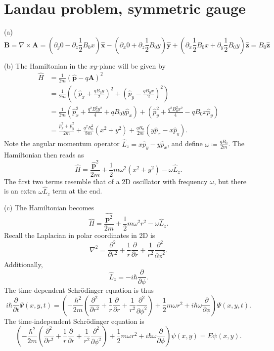 \documentclass[11pt, letterpaper]{article}
\begin{document}
\section{Landau problem, symmetric gauge}

(a) 
\[
	\mathbf{B} =\nabla \times \mathbf{A} =\left( \partial _y0 - \partial _z \frac{1}{2} B_0x \right) \mathbf{\hat{x} } -\left( \partial _x0+\partial _z\frac{1}{2} B_0y \right) \mathbf{\hat{y} } + \left( \partial _x\frac{1}{2} B_0x + \partial _y\frac{1}{2} B_0y \right) \mathbf{\hat{z} } =B_0\mathbf{\hat{z} } 
\]

(b) The Hamiltonian in the $xy$-plane will be given by
\begin{align*}
	\hat{H} &=\frac{1}{2m} \left( \hat{\mathbf{p} } -q \mathbf{A}  \right) ^2\\
		&=\frac{1}{2m} \left(\left( \hat{p} _x+\frac{qB_0y}{2} \right) ^2+  \left( \hat{p} _y - \frac{qB_0x}{2}  \right) ^2\right)\\
		&=\frac{1}{2m} \left( \hat{p}_x^2 +\frac{q^2B_0^2y^2}{4} +qB_0y \hat{p}_x\right) +\left( \hat{p} _y^2 + \frac{q^2B_0^2x^2}{4} -qB_0x \hat{p}_y \right) \\
		&=\frac{\hat{p} _x^2 + \hat{p} _y^2}{2m} +\frac{q^2B_0^2}{8m} \left( x^2+y^2 \right) +\frac{qB_0}{2m} \left( y \hat{p} _x - x \hat{p} _y \right) 
.\end{align*}
Note the angular momentum operator $\hat{L} _z = x \hat{p} _y -y \hat{p} _x$, and define $\omega \coloneqq \frac{qB_0}{2m} $. The Hamiltonian then reads as
\[
	\hat{H} =\frac{\hat{\mathbf{p} } ^2}{2m} +\frac{1}{2} m\omega ^2\left( x^2+y^2 \right) -\omega \hat{L} _z
.\]
The first two terms resemble that of a 2D oscillator with frequency $\omega $, but there is an extra $\omega \hat{L} _z$ term at the end.

(c) The Hamiltonian becomes
\[
	\hat{H} =\frac{\hat{\mathbf{p}^2 } }{2m} +\frac{1}{2} m\omega ^2 r^2 - \omega \hat{L} _z
.\]
Recall the Laplacian in polar coordinates in 2D is
\[
	\nabla ^2=\frac{\partial ^2}{\partial r^2} +\frac{1}{r} \frac{\partial }{\partial r} +\frac{1}{r^2} \frac{\partial ^2}{\partial \phi ^2} 
.\]
Additionally,
\[
	\hat{L} _z =-i\hbar \frac{\partial }{\partial \phi } 
.\]
The time-dependent Schr\"odinger equation is thus
\[
	i\hbar \frac{\partial }{\partial t} \Psi (x,y,t) = \left(-\frac{\hbar^2}{2m} \left( \frac{\partial ^2}{\partial r^2} +\frac{1}{r} \frac{\partial }{\partial r} +\frac{1}{r^2} \frac{\partial ^2}{\partial \phi ^2}  \right) +\frac{1}{2} m\omega r^2 + i\hbar \omega \frac{\partial }{\partial \phi } \right)\Psi (x,y,t)
.\]
The time-independent Schr\"odinger equation is
\[
	\left(-\frac{\hbar^2}{2m} \left( \frac{\partial ^2}{\partial r^2} +\frac{1}{r} \frac{\partial }{\partial r} +\frac{1}{r^2} \frac{\partial ^2}{\partial \phi ^2}  \right) +\frac{1}{2} m\omega r^2 + i\hbar \omega \frac{\partial }{\partial \phi } \right)\psi (x,y)=E\psi (x,y)
.\]
\end{document}
